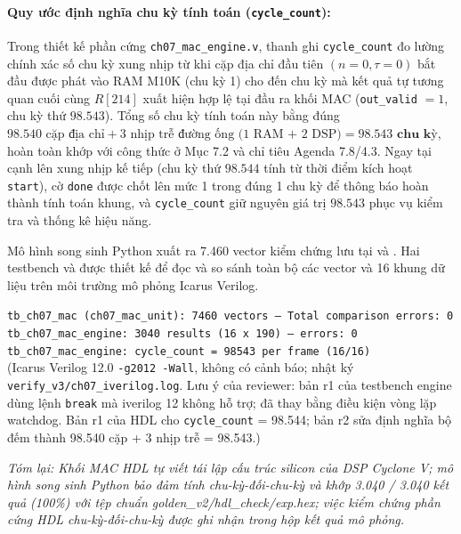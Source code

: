 \paragraph{Quy ước định nghĩa chu kỳ tính toán (\texttt{cycle\_count}):}
Trong thiết kế phần cứng \texttt{ch07\_mac\_engine.v}, thanh ghi \texttt{cycle\_count} đo lường chính xác số chu kỳ xung nhịp từ khi cặp địa chỉ đầu tiên $(n=0, \tau=0)$ bắt đầu được phát vào RAM M10K (chu kỳ 1) cho đến chu kỳ mà kết quả tự tương quan cuối cùng $R[214]$ xuất hiện hợp lệ tại đầu ra khối MAC (\texttt{out\_valid} $= 1$, chu kỳ thứ $98.543$). Tổng số chu kỳ tính toán này bằng đúng $98.540\text{ cặp địa chỉ} + 3\text{ nhịp trễ đường ống (1 RAM + 2 DSP)} = \mathbf{98.543\text{ chu kỳ}}$, hoàn toàn khớp với công thức ở Mục 7.2 và chỉ tiêu Agenda 7.8/4.3. Ngay tại cạnh lên xung nhịp kế tiếp (chu kỳ thứ $98.544$ tính từ thời điểm kích hoạt \texttt{start}), cờ \texttt{done} được chốt lên mức 1 trong đúng 1 chu kỳ để thông báo hoàn thành tính toán khung, và \texttt{cycle\_count} giữ nguyên giá trị $98.543$ phục vụ kiểm tra và thống kê hiệu năng.

Mô hình song sinh Python xuất ra 7.460 vector kiểm chứng lưu tại  và . Hai testbench  và  được thiết kế để đọc và so sánh toàn bộ các vector và 16 khung dữ liệu trên môi trường mô phỏng Icarus Verilog.

\small\texttt{tb\_ch07\_mac (ch07\_mac\_unit): 7460 vectors -- Total comparison errors: 0}\\
\small\texttt{tb\_ch07\_mac\_engine: 3040 results (16 x 190) -- errors: 0}\\
\small\texttt{tb\_ch07\_mac\_engine: cycle\_count = 98543 per frame (16/16)}\\
\footnotesize(Icarus Verilog 12.0 \texttt{-g2012 -Wall}, không có cảnh báo; nhật ký \texttt{verify\_v3/ch07\_iverilog.log}. Lưu ý của reviewer: bản r1 của testbench engine dùng lệnh \texttt{break} mà iverilog 12 không hỗ trợ; đã thay bằng điều kiện vòng lặp watchdog. Bản r1 của HDL cho \texttt{cycle\_count} = 98.544; bản r2 sửa định nghĩa bộ đếm thành 98.540 cặp + 3 nhịp trễ = 98.543.)

\textit{Tóm lại: Khối MAC HDL tự viết tái lập cấu trúc silicon của DSP Cyclone V; mô hình song sinh Python bảo đảm tính chu-kỳ-đối-chu-kỳ và khớp 3.040 / 3.040 kết quả (100\%) với tệp chuẩn golden\_v2/hdl\_check/exp.hex; việc kiểm chứng phần cứng HDL chu-kỳ-đối-chu-kỳ được ghi nhận trong hộp kết quả mô phỏng.}


